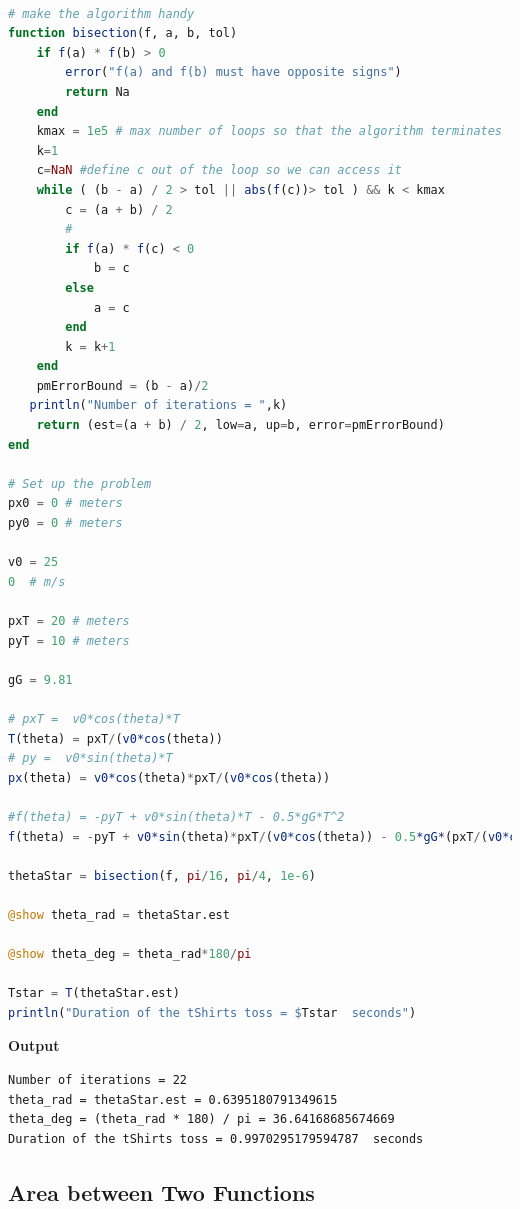 \begin{lstlisting}[language=Julia,style=mystyle]

# make the algorithm handy
function bisection(f, a, b, tol)
    if f(a) * f(b) > 0        
        error("f(a) and f(b) must have opposite signs")
        return Na
    end
    kmax = 1e5 # max number of loops so that the algorithm terminates
    k=1
    c=NaN #define c out of the loop so we can access it
    while ( (b - a) / 2 > tol || abs(f(c))> tol ) && k < kmax
        c = (a + b) / 2
        #
        if f(a) * f(c) < 0
            b = c
        else
            a = c
        end
        k = k+1
    end
    pmErrorBound = (b - a)/2
   println("Number of iterations = ",k)
    return (est=(a + b) / 2, low=a, up=b, error=pmErrorBound)
end

# Set up the problem
px0 = 0 # meters
py0 = 0 # meters

v0 = 25
0  # m/s

pxT = 20 # meters
pyT = 10 # meters

gG = 9.81

# pxT =  v0*cos(theta)*T
T(theta) = pxT/(v0*cos(theta))
# py =  v0*sin(theta)*T
px(theta) = v0*cos(theta)*pxT/(v0*cos(theta))

#f(theta) = -pyT + v0*sin(theta)*T - 0.5*gG*T^2
f(theta) = -pyT + v0*sin(theta)*pxT/(v0*cos(theta)) - 0.5*gG*(pxT/(v0*cos(theta)))^2

thetaStar = bisection(f, pi/16, pi/4, 1e-6)

@show theta_rad = thetaStar.est

@show theta_deg = theta_rad*180/pi

Tstar = T(thetaStar.est)
println("Duration of the tShirts toss = $Tstar  seconds")
\end{lstlisting}
\textbf{Output} 
\begin{verbatim}
Number of iterations = 22
theta_rad = thetaStar.est = 0.6395180791349615
theta_deg = (theta_rad * 180) / pi = 36.64168685674669
Duration of the tShirts toss = 0.9970295179594787  seconds
\end{verbatim}



\subsection{Area between Two Functions} 
\label{sec:AreaBetweenTwoFunc}


